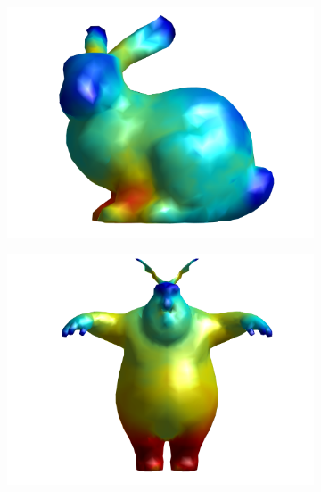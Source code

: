 \documentclass[11pt,titlepage]{article}
\begin{document}
\begin{figure}[!htbp]
    \begin{center}
        \quad
        \begin{subfigure}[b]{0.45\textwidth}
            \centering
            \includegraphics[width=\textwidth]{tet/resized/bunny_tiny_1}
        \end{subfigure}
        \begin{subfigure}[b]{0.45\textwidth}
            \centering
            \includegraphics[width=\textwidth]{tet/resized/bb-bunny_tiny_1}
        \end{subfigure}


\end{center}
\end{figure}
\end{document}
